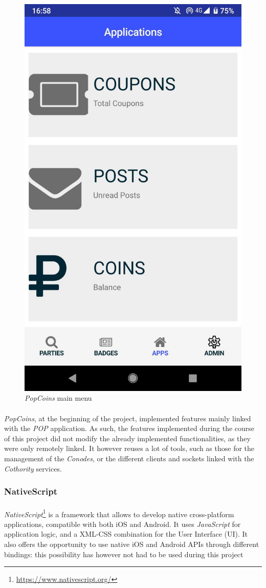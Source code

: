 \begin{figure}[!h]
    \centering
    \includegraphics[height=0.8\linewidth]{Illustrations/screen_mainmenu.jpg}
    \caption{\textit{PopCoins} main menu}
\end{figure}

\paragraph{}

\textit{PopCoins}, at the beginning of the project, implemented features mainly linked with the \textit{POP} application. As such, the features implemented during the course of this project did not modify the already implemented functionalities, as they were only remotely linked. It however reuses a lot of tools, such as those for the management of the \textit{Conodes}, or the different clients and sockets linked with the \textit{Cothority} services.

\subsubsection{NativeScript}

\paragraph{}

\textit{NativeScript}\footnote{\url{https://www.nativescript.org/}} is a framework that allows to develop native cross-platform applications, compatible with both iOS and Android. It uses \textit{JavaScript} for application logic, and a XML-CSS combination for the User Interface (UI). It also offers the opportunity to use native iOS and Android APIs through different bindings: this possibility has however not had to be used during this project

